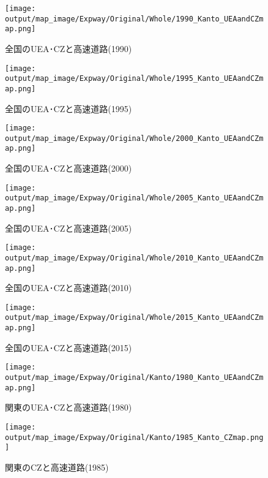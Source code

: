 \documentclass{ltjsarticle}
\begin{document}
\begin{figure}[pbth]
  \centering
  \texttt{[image: output/map\_image/Expway/Original/Whole/1990\_Kanto\_UEAandCZmap.png]}
  \caption{\label{1990:allCZandUEA}全国のUEA･CZと高速道路(1990)}
\end{figure}


\begin{figure}[pbth]
  \centering
  \texttt{[image: output/map\_image/Expway/Original/Whole/1995\_Kanto\_UEAandCZmap.png]}
  \caption{\label{1995:allCZandUEA}全国のUEA･CZと高速道路(1995)}
\end{figure}


\begin{figure}[pbth]
  \centering
  \texttt{[image: output/map\_image/Expway/Original/Whole/2000\_Kanto\_UEAandCZmap.png]}
  \caption{\label{2000:allCZandUEA}全国のUEA･CZと高速道路(2000)}
\end{figure}


\begin{figure}[pbth]
  \centering
  \texttt{[image: output/map\_image/Expway/Original/Whole/2005\_Kanto\_UEAandCZmap.png]}
  \caption{\label{2005:allCZandUEA}全国のUEA･CZと高速道路(2005)}
\end{figure}


\begin{figure}[pbth]
  \centering
  \texttt{[image: output/map\_image/Expway/Original/Whole/2010\_Kanto\_UEAandCZmap.png]}
  \caption{\label{2010:allCZandUEA}全国のUEA･CZと高速道路(2010)}
\end{figure}


\begin{figure}[pbth]
  \centering
  \texttt{[image: output/map\_image/Expway/Original/Whole/2015\_Kanto\_UEAandCZmap.png]}
  \caption{\label{2015:allCZandUEA}全国のUEA･CZと高速道路(2015)}
\end{figure}

\begin{figure}[pbth]
  \centering
  \texttt{[image: output/map\_image/Expway/Original/Kanto/1980\_Kanto\_UEAandCZmap.png]}
  \caption{\label{1980:KanCZandUEA}関東のUEA･CZと高速道路(1980)}
\end{figure}


\begin{figure}[pbth]
  \centering
  \texttt{[image: output/map\_image/Expway/Original/Kanto/1985\_Kanto\_CZmap.png]}
  \caption{\label{1985:KanCZandUEA}関東のCZと高速道路(1985)}
\end{figure}
\end{document}

